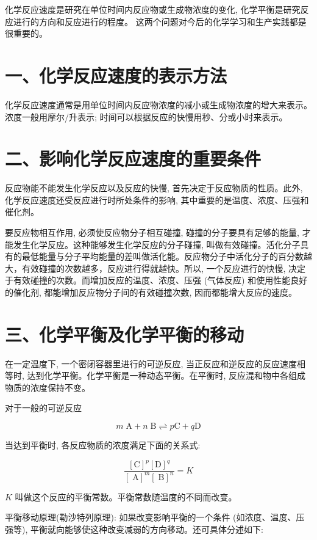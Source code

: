 \documentclass[10pt]{article}
\begin{document}
化学反应速度是研究在单位时间内反应物或生成物浓度的变化, 化学平衡是研究反应进行的方向和反应进行的程度。 这两个问题对今后的化学学习和生产实践都是很重要的。

\section*{一、化学反应速度的表示方法}

化学反应速度通常是用单位时间内反应物浓度的减小或生成物浓度的增大来表示。浓度一般用摩尔/升表示; 时间可以根据反应的快慢用秒、分或小时来表示。

\section*{二、影响化学反应速度的重要条件}

反应物能不能发生化学反应以及反应的快慢, 首先决定于反应物质的性质。此外, 化学反应速度还受反应进行时所处条件的影响, 其中重要的是温度、浓度、压强和催化剂。

要反应物相互作用, 必须使反应物分子相互碰撞, 碰撞的分子要具有足够的能量, 才能发生化学反应。这种能够发生化学反应的分子碰撞, 叫做有效碰撞。活化分子具有的最低能量与分子平均能量的差叫做活化能。反应物分子中活化分子的百分数越大，有效碰撞的次数越多，反应进行得就越快。所以, 一个反应进行的快慢, 决定于有效碰撞的次数。而增加反应的温度、浓度、压强 (气体反应) 和使用性能良好的催化剂, 都能增加反应物分子间的有效碰撞次数, 因而都能增大反应的速度。

\section*{三、化学平衡及化学平衡的移动}

在一定温度下, 一个密闭容器里进行的可逆反应, 当正反应和逆反应的反应速度相等时, 达到化学平衡。化学平衡是一种动态平衡。在平衡时, 反应混和物中各组成物质的浓度保持不变。

对于一般的可逆反应

\[
m\mathrm{\;A} + n\mathrm{\;B} \rightleftharpoons p\mathrm{C} + q\mathrm{D}
\]

当达到平衡时, 各反应物质的浓度满足下面的关系式:

\[
\frac{{\left\lbrack \mathrm{C}\right\rbrack }^{p}{\left\lbrack \mathrm{D}\right\rbrack }^{q}}{{\left\lbrack \mathrm{\;A}\right\rbrack }^{m}{\left\lbrack \mathrm{\;B}\right\rbrack }^{n}} = K
\]

\(K\) 叫做这个反应的平衡常数。平衡常数随温度的不同而改变。

平衡移动原理(勒沙特列原理): 如果改变影响平衡的一个条件 (如浓度、温度、压强等), 平衡就向能够使这种改变减弱的方向移动。还可具体分述如下:
\end{document}

